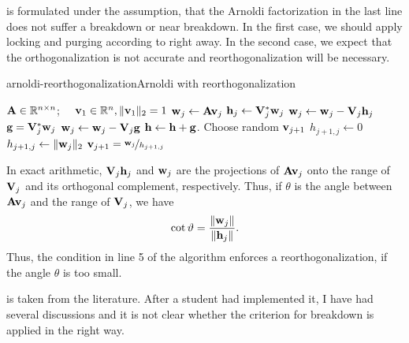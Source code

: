 \begin{remark}
   is formulated under the assumption, that
  the Arnoldi factorization in the last line does not suffer a
  breakdown or near breakdown. In the first case, we should apply
  locking and purging according to
   right away. In the second
  case, we expect that the orthogonalization is not accurate and
  reorthogonalization will be necessary.
\end{remark}

\begin{Algorithm*}{arnoldi-reorthogonalization}{Arnoldi with reorthogonalization}
  \begin{algorithmic}[1]
    \Require $\mathbf A\in\mathbb R^{n\times n}$; $\quad\mathbf v_1\in\mathbb R^n, \lVert\mathbf v_1\rVert_2 = 1$
    \State $\mathbf w_j \gets \mathbf A\mathbf v_j$
    \State $\mathbf h_{j} \gets \mathbf V_j^*\mathbf w_j$
    \State $\mathbf w_j \gets \mathbf w_j - \mathbf V_j\mathbf h_{j}$
     
    \State $\mathbf g = \mathbf V_j^*\mathbf w_j$
    \State $\mathbf w_j \gets \mathbf w_j - \mathbf V_j\mathbf g$
    \State $\mathbf h \gets \mathbf h + \mathbf g$.
    \EndIf
    \State Choose random $\mathbf v_{j+1}$
    \State $h_{j+1,j} \gets 0$
    \Else
    \State $h_{j+1,j} \gets \lVert\mathbf w_j\rVert_2$
    \State $\mathbf v_{j+1} = \nicefrac{\mathbf w_j}{h_{j+1,j}}$
    \EndIf
    \EndFor
  \end{algorithmic}
\end{Algorithm*}

\begin{remark}
  In exact arithmetic, $\mathbf V_j\mathbf h_j$ and $\mathbf w_j$ are the projections
  of $\mathbf A\mathbf v_j$ onto the range of $\mathbf V_j$ and its orthogonal
  complement, respectively. Thus, if $\theta$ is the angle between
  $\mathbf A\mathbf v_j$ and the range of $\mathbf V_j$, we have
  \begin{gather}
    \cot\vartheta = \frac{\lVert\mathbf w_j\rVert}{\lVert\mathbf h_j\rVert}.
  \end{gather}
  Thus, the condition in line 5 of the algorithm enforces a
  reorthogonalization, if the angle $\theta$ is too small.

   is taken from the
  literature. After a student had implemented it, I have had several
  discussions and it is not clear whether the criterion for breakdown
  is applied in the right way.
\end{remark}

